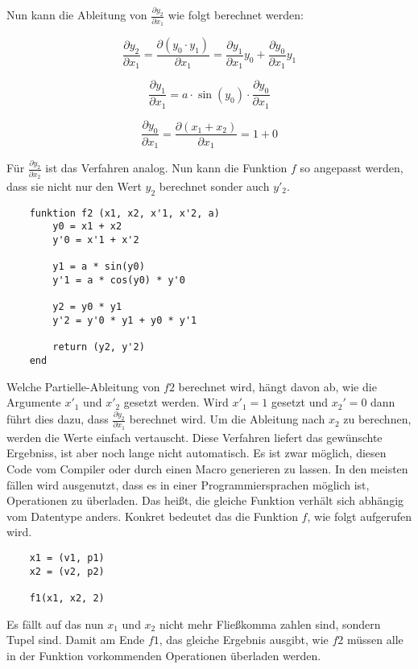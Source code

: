 Nun kann die Ableitung von $\frac{\partial y_2}{\partial x_1}$ wie folgt berechnet werden:

$$
	\frac{\partial y_2}{\partial x_1} = \frac{\partial (y_0 \cdot y_1)}{\partial x_1} = \frac{\partial  y_1}{\partial x_1} y_0  + \frac{\partial y_0 }{\partial x_1} y_1
$$

$$
	\frac{\partial y_1}{ \partial x_1 } = a \cdot \sin(y_0) \cdot \frac{\partial y_0}{\partial x_1}
$$

$$
	\frac{\partial y_0}{\partial x_1} = \frac{\partial (x_1 + x_2)}{\partial x_1} = 1 + 0
$$

Für $\frac{\partial y_2}{\partial x_2}$ ist das Verfahren analog. 
Nun kann die Funktion $f$ so angepasst werden, dass sie nicht nur den Wert $y_2$ berechnet sonder auch $y'_2$.

\begin{lstlisting}
    funktion f2 (x1, x2, x'1, x'2, a)
        y0 = x1 + x2
        y'0 = x'1 + x'2

        y1 = a * sin(y0)
        y'1 = a * cos(y0) * y'0

		y2 = y0 * y1
        y'2 = y'0 * y1 + y0 * y'1
        
        return (y2, y'2)
    end
\end{lstlisting}

Welche Partielle-Ableitung von $f2$ berechnet wird, hängt davon ab, wie die Argumente $x'_1$ und $x'_2$ gesetzt werden.
Wird $x'_1 = 1$ gesetzt und $x_2' = 0$ dann führt dies dazu, dass $\frac{\partial y_2}{\partial x_1}$ berechnet wird.
Um die Ableitung nach $x_2$ zu berechnen, werden die Werte einfach vertauscht.
Diese Verfahren liefert das gewünschte Ergebniss, ist aber noch lange nicht automatisch.
Es ist zwar möglich, diesen Code vom Compiler oder durch einen Macro generieren zu lassen.
In den meisten fällen wird ausgenutzt, dass es in einer 
Programmiersprachen möglich ist, Operationen zu überladen.
Das heißt, die gleiche Funktion verhält sich abhängig vom Datentype anders.
Konkret bedeutet das die Funktion $f$, wie folgt aufgerufen wird.

\begin{lstlisting}
	x1 = (v1, p1)
    x2 = (v2, p2)
    
    f1(x1, x2, 2)
\end{lstlisting}

Es fällt auf das nun $x_1$ und $x_2$ nicht mehr Fließkomma zahlen sind, sondern Tupel sind.
Damit am Ende $f1$, das gleiche Ergebnis ausgibt, wie $f2$ müssen alle in der Funktion vorkommenden Operationen überladen werden.

